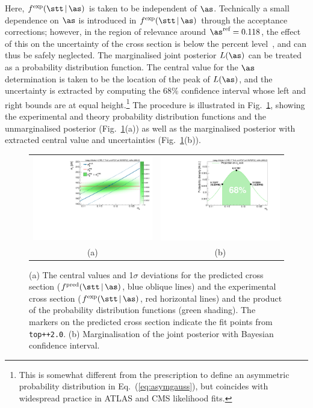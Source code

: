 %
Here, $f^{\text{exp}}(\stt\,|\,\as)$ is taken to be independent of
$\as$. Technically a small dependence on $\as$ is introduced in
$f^{\text{exp}}(\stt\,|\,\as)$ through the acceptance corrections;
however, in the region of relevance around $\as^{\text{ref}} = 0.118$,
the effect of this on the uncertainty of the cross section is below
the percent level~\cite{Chatrchyan:2013haa}, and can thus be safely
neglected.  
%
The marginalised joint posterior $L(\as)$ can be treated
as a probability distribution function. 
%
The central value for the $\as$ determination is taken to be the
location of the peak of $L(\as)$, and the
%
uncertainty is extracted by computing the 68\% confidence interval
whose left and right bounds are at equal height.\footnote{This is
  somewhat different from the prescription to define an asymmetric
  probability distribution in Eq.~(\ref{eq:asymgauss}), but coincides
  with widespread practice in ATLAS and CMS likelihood fits.}
%
The procedure is illustrated in Fig.~\ref{fig:fullproc}, showing the
experimental and theory probability distribution functions and the
unmarginalised posterior (Fig.~\ref{fig:fullproc}(a)) as well as the
marginalised posterior with extracted central value and uncertainties
(Fig.~\ref{fig:fullproc}(b)).


\begin{figure}[htb]
\centering
\begin{tabular}{cc}
\includegraphics[width=0.5\linewidth]{img/alphas/fullproc.pdf}
&
\includegraphics[width=0.5\linewidth]{img/alphas/alphasDistribution.pdf}
\\
(a) & (b)
\end{tabular}
\vspace{-0.3cm}
\caption{
  (a) The central values and 1$\sigma$ deviations for the predicted cross
  section ($f^{\text{pred}}(\stt\,|\,\as)$, blue oblique lines) and
  the experimental cross section ($f^{\text{exp}}(\stt\,|\,\as)$,
  red horizontal lines) 
  and the product of the probability distribution functions (green
  shading).
  The markers on the predicted cross
  section indicate the fit points from \texttt{top++2.0}. (b)
  Marginalisation of the joint posterior with Bayesian confidence
  interval.
  }
\label{fig:fullproc}
\end{figure}


